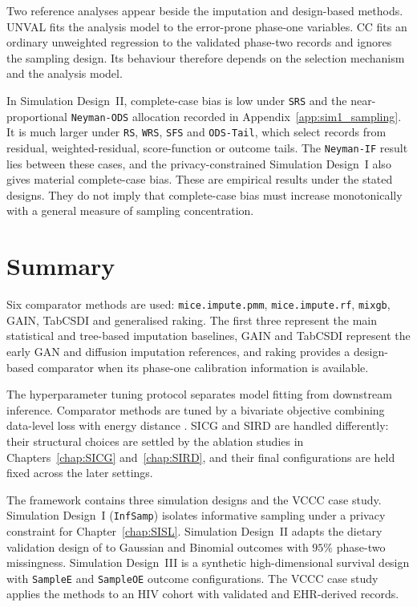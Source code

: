 Two reference analyses appear beside the imputation and design-based methods. UNVAL fits the analysis model to the error-prone phase-one variables. CC fits an ordinary unweighted regression to the validated phase-two records and ignores the sampling design. Its behaviour therefore depends on the selection mechanism and the analysis model.

In Simulation Design~II, complete-case bias is low under \texttt{SRS} and the near-proportional \texttt{Neyman-ODS} allocation recorded in Appendix~\ref{app:sim1_sampling}. It is much larger under \texttt{RS}, \texttt{WRS}, \texttt{SFS} and \texttt{ODS-Tail}, which select records from residual, weighted-residual, score-function or outcome tails. The \texttt{Neyman-IF} result lies between these cases, and the privacy-constrained Simulation Design~I also gives material complete-case bias. These are empirical results under the stated designs. They do not imply that complete-case bias must increase monotonically with a general measure of sampling concentration.

\section{Summary}

Six comparator methods are used: \texttt{mice.impute.pmm}, \texttt{mice.impute.rf}, \texttt{mixgb}, GAIN, TabCSDI and generalised raking. The first three represent the main statistical and tree-based imputation baselines, GAIN and TabCSDI represent the early GAN and diffusion imputation references, and raking provides a design-based comparator when its phase-one calibration information is available.

The hyperparameter tuning protocol separates model fitting from downstream inference. Comparator methods are tuned by a bivariate objective combining data-level loss with energy distance \citep{szekely2003statistics, naf2023imputation, naf2025mar}. SICG and SIRD are handled differently: their structural choices are settled by the ablation studies in Chapters~\ref{chap:SICG} and~\ref{chap:SIRD}, and their final configurations are held fixed across the later settings.

The framework contains three simulation designs and the VCCC case study. Simulation Design~I (\texttt{InfSamp}) isolates informative sampling under a privacy constraint for Chapter~\ref{chap:SISL}. Simulation Design~II adapts the dietary validation design of \citet{baldoni2021use} to Gaussian and Binomial outcomes with $95\%$ phase-two missingness. Simulation Design~III is a synthetic high-dimensional survival design with \texttt{SampleE} and \texttt{SampleOE} outcome configurations. The VCCC case study applies the methods to an HIV cohort with validated and EHR-derived records.

